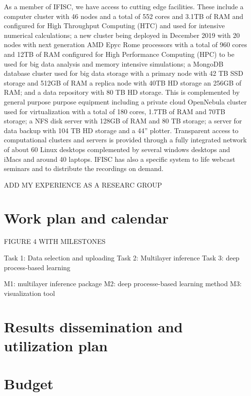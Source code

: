 \documentclass[authoryear,1p,12pt]{elsarticle}
\begin{document}
     
     As a member of IFISC, we have access to cutting edge
     facilities. These include a computer cluster with 46 nodes and a
     total of 552 cores and 3.1TB of RAM and configured for High
     Throughput Computing (HTC) and used for intensive numerical
     calculations; a new cluster being deployed in December 2019 with
     20 nodes with next generation AMD Epyc Rome processors with a
     total of 960 cores and 12TB of RAM configured for High
     Performance Computing (HPC) to be used for big data analysis and
     memory intensive simulations; a MongoDB database cluster used for
     big data storage with a primary node with 42 TB SSD storage and
     512GB of RAM a replica node with 40TB HD storage an 256GB of RAM;
     and a data repository with 80 TB HD storage. This is complemented
     by general purpose purpose equipment including a private cloud
     OpenNebula cluster used for virtualization with a total of 180
     cores, 1.7TB of RAM and 70TB storage; a NFS disk server with
     128GB of RAM and 80 TB storage; a server for data backup with 104
     TB HD storage and a 44'' plotter. Transparent access to
     computational clusters and servers is provided through a fully
     integrated network of about 60 Linux desktops complemented by
     several windows desktops and iMacs and around 40 laptops. IFISC
     has also a specific system to life webcast seminars and to
     distribute the recordings on demand.
     
     ADD MY EXPERIENCE AS A RESEARC GROUP
     
     \newpage
     \section{Work plan and calendar}

FIGURE 4 WITH MILESTONES 
     
     Task 1: Data selection and uploading
     Task 2: Multilayer inference
     Task 3: deep process-based learning

     M1: multilayer inference package
     M2: deep processe-based learning method
     M3: visualization tool

     \newpage
     \section{Results dissemination and utilization plan}

     
    
     \newpage
     \section{Budget}
     
\end{document}
